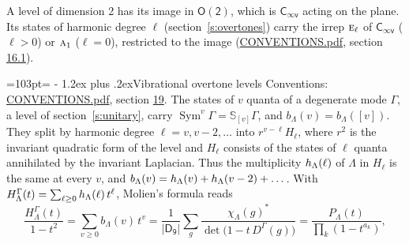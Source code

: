 \documentclass[10pt,a4paper]{article}
\makeatletter
\renewcommand\section{\@startsection{section}{1}{\z@}{-3ex plus -1ex minus -.2ex}%
  {1.2ex plus .2ex}{\normalfont\large\sffamily\bfseries\color{parttitle}}}
\newcommand{\needspace}[1]{\par\penalty-100\begingroup\dimen0=#1\relax\dimen2=\pagegoal
  \advance\dimen2-\pagetotal\ifdim\dimen0>\dimen2\relax\ifdim\dimen2>0pt\vfil\break\fi\fi
  \endgroup}
\numberwithin{equation}{section}
\newcommand{\grp}[1]{\mathsf{#1}}
\newcommand{\irr}[1]{\text{\normalfont\scshape #1}}
\newcommand{\repD}[1]{D^{#1}}
\newcommand{\irchar}[1]{\chi_{#1}}
\newcommand{\conj}[1]{{#1}^{*}}
\newcommand{\schur}[1]{\mathbb{S}_{#1}}
\newcommand{\shape}[1]{[#1]}
\makeatother
\begin{document}
A level of dimension 2 has its image in $\grp{O(2)}$, which is \href{Cinfv.pdf}{$\grp{C_{\infty v}}$} acting on the plane. \label{n:index.harmonic.degree}Its states of harmonic degree $\ell$ (section~\ref{s:overtones}) carry the irrep $\irr{e}_{\ell}$ of \href{Cinfv.pdf}{$\grp{C_{\infty v}}$} ($\ell > 0$) or $\irr{a}_{1}$ ($\ell = 0$), restricted to the image (\href{../../CONVENTIONS.pdf}{CONVENTIONS.pdf}, section \href{../../CONVENTIONS.pdf\#conv.16.1}{16.1}).
\needspace{103pt}
\section{Vibrational overtone levels}\label{s:overtones}
Conventions: \href{../../CONVENTIONS.pdf}{CONVENTIONS.pdf}, section \href{../../CONVENTIONS.pdf\#conv.19}{19}.
\leavevmode\label{n:index.quanta}\label{n:operator.symmetric.power}The states of $v$ quanta of a degenerate mode $\Gamma$, a level of section~\ref{s:unitary}, carry $\operatorname{Sym}^{v}\Gamma = \schur{\shape{v}}\Gamma$, and $b_\Lambda(v) = b_\Lambda(\shape{v})$. \label{n:local.quadratic.form}\label{n:set.harmonic}They split by harmonic degree $\ell = v, v - 2, \dots$ into $r^{v-\ell}H_\ell$, where $r^2$ is the invariant quadratic form of the level and $H_\ell$ consists of the states of $\ell$ quanta annihilated by the invariant Laplacian. \label{n:function.multiplicity.harmonic}Thus the multiplicity $\mathnormal{h}_\Lambda(\ell)$ of $\Lambda$ in $H_\ell$ is the same at every $v$, and $b_\Lambda(v) = \mathnormal{h}_\Lambda(v) + \mathnormal{h}_\Lambda(v - 2) + \dots$. \label{n:function.generating.level}With $H^{\Gamma}_\Lambda(t) = \sum_{\ell\ge0} \mathnormal{h}_\Lambda(\ell)\,t^{\ell}$, Molien's formula reads
\begin{equation}\label{e:molien}\frac{H^{\Gamma}_\Lambda(t)}{1 - t^2} = \sum_{v\ge0} b_\Lambda(v)\,t^v = \frac{1}{|\grp{D_{9}}|}\sum_{g}\frac{\conj{\irchar{\Lambda}(g)}}{\det\bigl(1 - t\,\repD{\Gamma}(g)\bigr)} = \frac{P_\Lambda(t)}{\prod_k (1-t^{a_k})},\end{equation}
\end{document}
